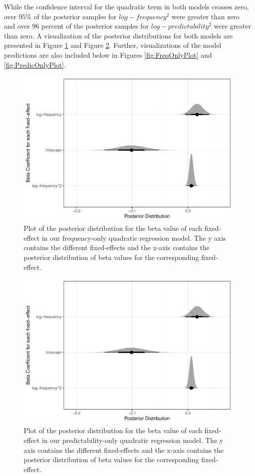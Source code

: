 \documentclass[
  man,floatsintext]{apa6}
\begin{document}
While the confidence interval for the quadratic term in both models crosses zero, over 95\% of the posterior samples for \(log-frequency^2\) were greater than zero and over 96 percent of the posterior samples for \(log-predictability^2\) were greater than zero. A visualization of the posterior distributions for both models are presented in Figure \ref{fig:FreqOnlyBetaPlot} and Figure \ref{fig:PredicOnlyBetaPlot}. Further, visualizations of the model predictions are also included below in Figures \ref{fig:FreqOnlyPlot} and \ref{fig:PredicOnlyPlot}.

\begin{figure}

{\centering \includegraphics[width=0.8\linewidth]{write-up_files/figure-latex/FreqOnlyBetaPlot-1} 

}

\caption{Plot of the posterior distribution for the beta value of each fixed-effect in our frequency-only quadratic regression model. The y axis contains the different fixed-effects and the x-axis contains the posterior distribution of beta values for the corresponding fixed-effect.}\label{fig:FreqOnlyBetaPlot}
\end{figure}

\begin{figure}

{\centering \includegraphics[width=0.8\linewidth]{write-up_files/figure-latex/PredicOnlyBetaPlot-1} 

}

\caption{Plot of the posterior distribution for the beta value of each fixed-effect in our predictability-only quadratic regression model. The y axis contains the different fixed-effects and the x-axis contains the posterior distribution of beta values for the corresponding fixed-effect.}\label{fig:PredicOnlyBetaPlot}
\end{figure}
\end{document}
